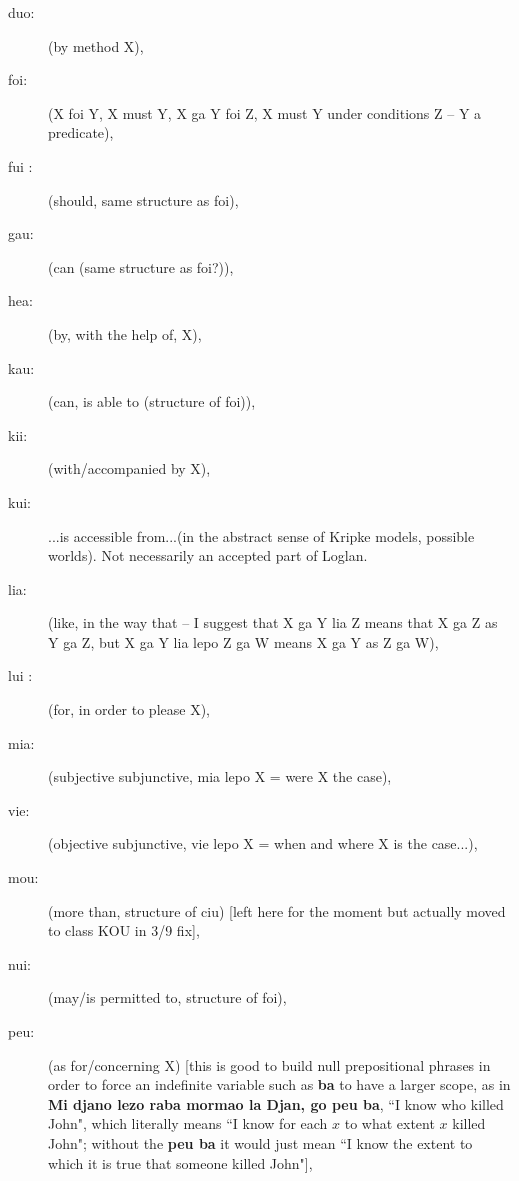 \documentclass[12pt]{book}
\begin{document}
\begin{description}
\item[duo:]  (by method X), 

\item[foi:]   (X foi Y, X must Y, X ga Y foi Z, X must Y under conditions Z  -- Y a predicate), 

\item[fui :]  (should, same structure as foi), 

\item[gau:] (can (same structure as foi?)), 

\item[hea:]  (by, with the help of, X), 

\item[kau:] (can, is able to (structure of foi)), 

\item[kii:]  (with/accompanied by X), 

\item[kui:] ...is accessible from...(in the abstract sense of Kripke models, possible worlds).  Not necessarily an accepted part of Loglan.  

\item[lia:]   (like, in the way that  -- I suggest that X ga Y lia Z means that X ga Z as Y ga Z, but X ga Y lia lepo Z ga W means X ga Y as Z ga W), 

\item[lui :] (for, in order to please X), 

\item[mia:]   (subjective subjunctive, mia lepo X = were X the case), 

\item[vie:]  (objective subjunctive, vie lepo X = when and where X is the case...),

\item[mou:]  (more than, structure of ciu) [left here for the moment but actually moved to class KOU in 3/9 fix],

\item[nui:]   (may/is permitted to, structure of foi), 

\item[peu:]  (as for/concerning X) [this is good to build null prepositional phrases in order to force an indefinite variable such as {\bf ba} to have a larger scope, as in
{\bf Mi djano lezo raba mormao la Djan, go peu ba}, ``I know who killed John", which literally means ``I know for each $x$ to what extent $x$ killed John"; without the {\bf peu ba} it would just mean ``I know the extent to which it is true that someone killed John"], 


\end{description}
\end{document}
